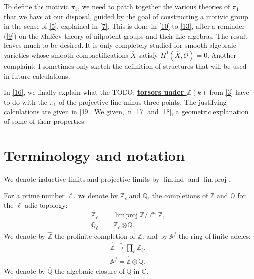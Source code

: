 \documentclass{article}
\theoremstyle{definition}
\newenvironment{env}[1]
    {\renewcommand\theinnercustomenv{(#1)}\innercustomenv}
    {\endinnercustomenv}
\newcommand{\sh}[1]{{\mathscr{#1}}}
\newcommand{\bb}{\mathbb}
\newcommand{\ZZ}{\bb{Z}}
\newcommand{\hZZ}{\widehat{\bb{Z}}}
\renewcommand{\AA}{\bb{A}}
\newcommand{\CC}{\bb{C}}
\newcommand{\QQ}{\bb{Q}}
\newcommand{\cQQ}{\overline{\QQ}}
\DeclareMathOperator{\limind}{lim\,ind}
\DeclareMathOperator{\limproj}{lim\,proj}
\newcommand{\unsure}[1]{TODO: \underline{\textbf{#1}}}
\newcommand{\oldpage}[1]{\marginpar{\footnotesize$\Big\vert$ \textit{p.~#1}}}
\begin{document}
To define the motivic $\pi_1$, we need to patch together the various theories of $\pi_1$ that we have at our disposal, guided by the goal of constructing a motivic group in the sense of \cref{5}, explained in \cref{7}.
This is done in \cref{10} to \cref{13}, after a reminder (\cref{9}) on the Mal\v{c}ev theory of nilpotent groups and their Lie algebras.
The result leaves much to be desired.
It is only completely studied for smooth algebraic varieties whose smooth compactifications $\overline{X}$ satisfy $H^1(\overline{X},\sh{O})=0$.
Another complaint: I sometimes only sketch the definition of structures that will be used in future calculations.

In \cref{16}, we finally explain what the \unsure{torsors under $\ZZ(k)$} from \cref{3} have to do with the $\pi_1$ of the projective line minus three points.
The justifying calculations are given in \cref{19}.
We given, in \cref{17} and \cref{18}, a geometric explanation of some of their properties.

\oldpage{87}
\section{Terminology and notation}
\label{0}

\begin{env}{0.1}
\label{0.1}
  We denote inductive limits and projective limits by $\limind$ and $\limproj$.
\end{env}

\begin{env}{0.2}
\label{0.2}
  For a prime number $\ell$, we denote by $\ZZ_\ell$ and $\QQ_\ell$ the completions of $\ZZ$ and $\QQ$ for the $\ell$-adic topology:
  \[
    \begin{aligned}
      \ZZ_\ell &= \limproj \ZZ/\ell^n\ZZ,
    \\\QQ_\ell &= \ZZ_\ell\otimes\QQ.
    \end{aligned}
  \]
  We denote by $\hZZ$ the profinite completion of $\ZZ$, and by $\AA^f$ the ring of finite adeles:
  \[
    \begin{gathered}
      \hZZ \xrightarrow{\sim} \prod_\ell \ZZ_\ell,
    \\\AA^f = \hZZ\otimes\QQ.
    \end{gathered}
  \]
  We denote by $\cQQ$ the algebraic closure of $\QQ$ in $\CC$.
\end{env}



\nocite{*}
\end{document}
